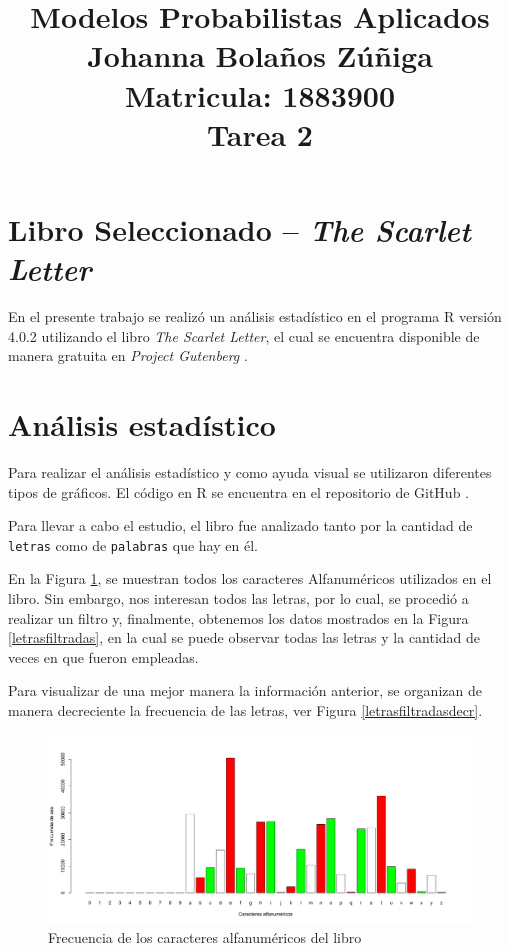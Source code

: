 \documentclass[fontsize=12pt]{article}
\title{
\centering
Modelos Probabilistas Aplicados \\
Johanna Bolaños Zúñiga \\
Matricula: 1883900\\
Tarea 2
}
\date{}
\begin{document}
\maketitle

\section{Libro Seleccionado -- \textit{The Scarlet Letter}}

En el presente trabajo se realizó un análisis estadístico en el programa R versión 4.0.2 \cite{r} utilizando el libro \textit{The Scarlet Letter}, el cual se encuentra disponible de manera gratuita en \textit{Project Gutenberg} \cite{libro}.

\section{Análisis estadístico}
Para realizar el análisis estadístico y como ayuda visual se utilizaron diferentes tipos de gráficos. El código en R se encuentra en el repositorio de GitHub \cite{github}. 

Para llevar a cabo el estudio, el libro fue analizado tanto por la cantidad de \texttt{letras} como de \texttt{palabras} que hay en él.

En la Figura \ref{letras}, se muestran todos los caracteres Alfanuméricos utilizados en el libro. Sin embargo, nos interesan todos las letras, por lo cual, se procedió a realizar un filtro y, finalmente, obtenemos los datos mostrados en la Figura \ref{letrasfiltradas}, en la cual se puede observar todas las letras y la cantidad de veces en que fueron empleadas. 

Para visualizar de una mejor manera la información anterior, se organizan de manera decreciente la frecuencia de las letras, ver Figura \ref{letrasfiltradasdecr}. 

\begin{figure}
\centering
\includegraphics[scale=0.45]{Figures/letrasEnElTexto.png}
\caption{Frecuencia de los caracteres alfanuméricos del libro}
\label{letras}
\end{figure}
\end{document}
